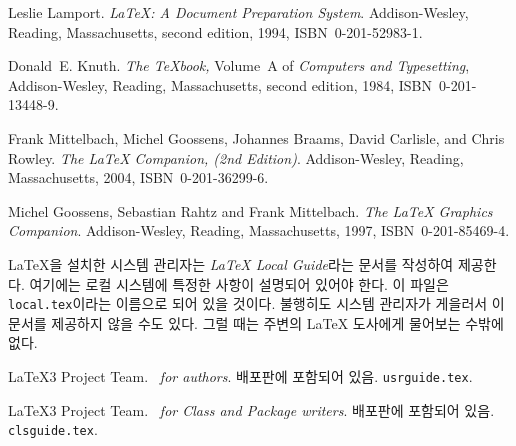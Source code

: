 \begin{thebibliography}{99}
 Leslie Lamport.  \newblock \emph{{\LaTeX:} A Document
    Preparation System}.  \newblock Addison-Wesley, Reading,
  Massachusetts, second edition, 1994, ISBN~0-201-52983-1.

 Donald~E. Knuth.  \newblock \textit{The \TeX{}book,}
  Volume~A of \textit{Computers and Typesetting}, Addison-Wesley,
  Reading, Massachusetts, second edition, 1984, ISBN~0-201-13448-9.

 Frank Mittelbach, Michel Goossens, Johannes Braams,
  David Carlisle, and Chris Rowley.  \newblock \emph{The {\LaTeX} Companion, (2nd Edition)}.  \newblock
  Addison-Wesley, Reading, Massachusetts, 2004, ISBN~0-201-36299-6.

 Michel Goossens, Sebastian Rahtz and Frank
  Mittelbach.  \newblock \emph{The {\LaTeX} Graphics Companion}.  \newblock
  Addison-Wesley, Reading, Massachusetts, 1997, ISBN~0-201-85469-4.

 \LaTeX{}을 설치한 시스템 관리자는 \emph{\LaTeX{} Local Guide}라는 
  문서를 작성하여 제공한다. 여기에는 로컬 시스템에 특정한 사항이 설명되어 있어야 한다.
  이 파일은 \texttt{local.tex}이라는 이름으로 되어 있을 것이다. 
  불행히도 시스템 관리자가 게을러서 이 문서를 제공하지 않을 수도 있다. 그럴 때는 
  주변의 \LaTeX{} 도사에게 물어보는 수밖에 없다.

 \LaTeX3 Project Team.  \newblock \emph{\LaTeXe~for
    authors}. 
  \newblock \LaTeXe{} 배포판에 포함되어 있음. \texttt{usrguide.tex}.

 \LaTeX3 Project Team.  \newblock \emph{\LaTeXe~for
    Class and Package writers}. 
  \newblock \LaTeXe{} 배포판에 포함되어 있음. \texttt{clsguide.tex}.


\end{thebibliography}
